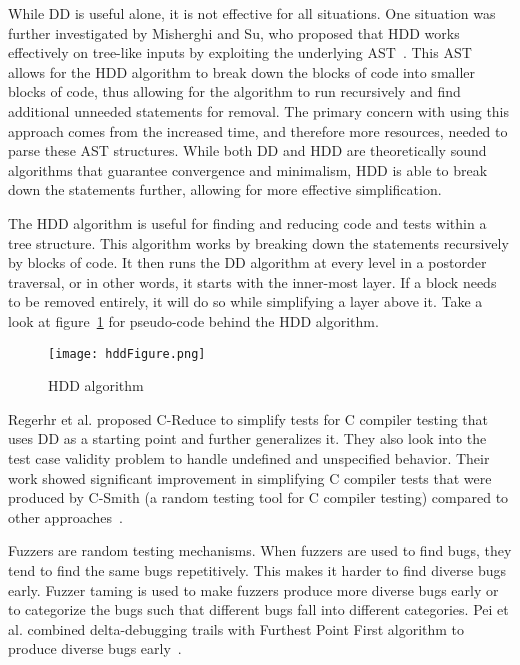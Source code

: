 While DD is useful alone, it is not effective for all situations. One situation was further investigated by Misherghi and Su, who proposed that HDD works effectively on tree-like inputs by exploiting the underlying AST~\cite{misherghi2006hdd}. This AST allows for the HDD algorithm to break down the blocks of code into smaller blocks of code, thus allowing for the algorithm to run recursively and find additional unneeded statements for removal. The primary concern with using this approach comes from the increased time, and therefore more resources, needed to parse these AST structures. While both DD and HDD are theoretically sound algorithms that guarantee convergence and minimalism, HDD is able to break down the statements further, allowing for more effective simplification. 

The HDD algorithm is useful for finding and reducing code and tests within a tree structure. This algorithm works by breaking down the statements recursively by blocks of code. It then runs the DD algorithm at every level in a postorder traversal, or in other words, it starts with the inner-most layer. If a block needs to be removed entirely, it will do so while simplifying a layer above it. Take a look at figure~\ref{fig:hddFigure} for pseudo-code behind the HDD algorithm.

\begin{center}
\begin{figure}[!ht]
\texttt{[image: hddFigure.png]}
\caption{HDD algorithm~\cite{misherghi_su_2009}}
\label{fig:hddFigure}
\end{figure}
\end{center}

Regerhr et al. proposed C-Reduce to simplify tests for C compiler testing that uses DD as a starting point and further generalizes it. They also look into the test case validity problem to handle undefined and unspecified behavior. Their work showed significant improvement in simplifying C compiler tests that were produced by C-Smith (a random testing tool for C compiler testing) compared to other approaches~\cite{regehr2012test}.

Fuzzers are random testing mechanisms. When fuzzers are used to find bugs, they tend to find the same bugs repetitively. This makes it harder to find diverse bugs early. Fuzzer taming is used to make fuzzers produce more diverse bugs early or to categorize the bugs such that different bugs fall into different categories. Pei et al. combined delta-debugging trails with Furthest Point First algorithm to produce diverse bugs early~\cite{7022682}.

